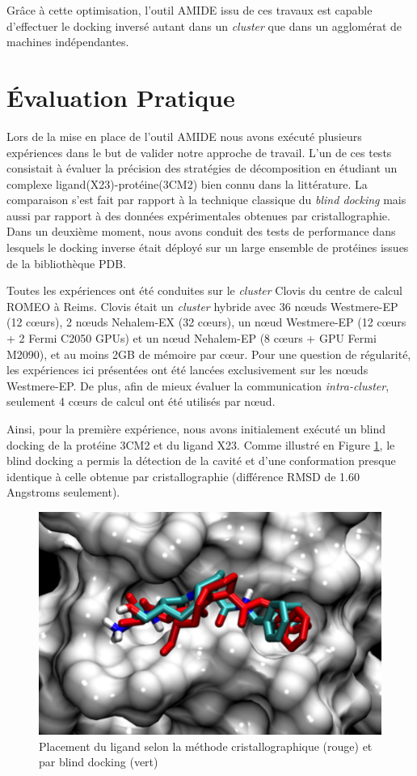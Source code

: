  Grâce à cette optimisation, l'outil AMIDE issu de ces travaux est capable d'effectuer le docking inversé autant dans un \textit{cluster} que dans un agglomérat de machines indépendantes.
 
 \section{Évaluation Pratique}
 
 Lors de la mise en place de l'outil AMIDE nous avons exécuté plusieurs expériences dans le but de valider notre approche de travail. L'un de ces tests consistait à évaluer la précision des stratégies de décomposition en étudiant un complexe ligand(X23)-protéine(3CM2) bien connu dans la littérature. La comparaison s'est fait par rapport à la technique classique du \textit{blind docking} mais aussi par rapport à des données expérimentales obtenues par cristallographie. Dans un deuxième moment, nous avons conduit des tests de performance dans lesquels le docking inverse était déployé sur un large ensemble de protéines issues de la bibliothèque PDB.
 
Toutes les expériences ont été conduites sur le \textit{cluster} Clovis du centre de calcul ROMEO à Reims. Clovis était un \textit{cluster} hybride avec 36 n{\oe}uds Westmere-EP (12 c{\oe}urs), 2 n{\oe}uds Nehalem-EX (32 c{\oe}urs), un n{\oe}ud Westmere-EP (12 c{\oe}urs + 2 Fermi C2050 GPUs) et un n{\oe}ud Nehalem-EP (8 c{\oe}urs + GPU Fermi M2090), et au moins 2GB de mémoire par c{\oe}ur. Pour une question de régularité, les expériences ici présentées ont été lancées exclusivement sur les n{\oe}uds Westmere-EP. De plus, afin de mieux évaluer la communication \textit{intra-cluster}, seulement 4 c{\oe}urs de calcul ont été utilisés par n{\oe}ud.
 
 Ainsi, pour la première expérience, nous avons initialement exécuté un blind docking de la protéine 3CM2 et du ligand X23. Comme illustré en  Figure \ref{fig:blind}, le blind docking a permis la détection de la cavité et d'une conformation presque identique à celle obtenue par cristallographie (différence RMSD de 1.60 Angstroms seulement).
 
 \begin{figure}[h]
 	\centering
 		\includegraphics[width=0.75\linewidth]{images/Romain/fig4-color} 
 		\caption{Placement du ligand selon la méthode cristallographique (rouge) et par blind docking (vert)}\label{fig:blind} %
 \end{figure}
 
